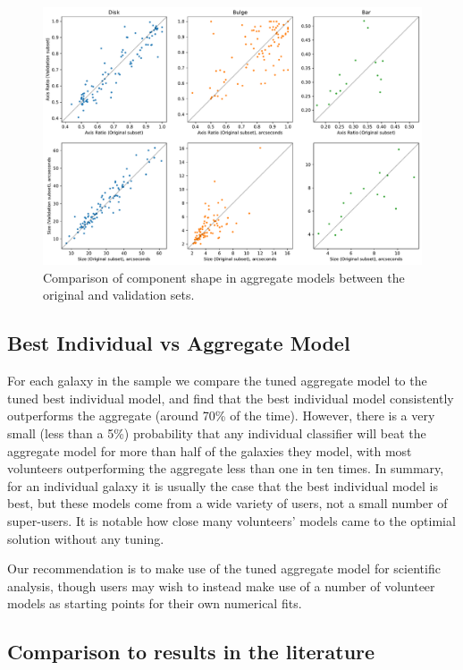 \documentclass[../main.tex]{subfiles}
\begin{document}
\begin{figure}
  \includegraphics[width=17.3cm]{images__results/component_sizing.pdf}
  \caption{Comparison of component shape in aggregate models between the original and validation sets.}
  \label{fig:aggregate_model_consistency}
\end{figure}

\subsection{Best Individual vs Aggregate Model}

For each galaxy in the sample we compare the tuned aggregate model to the tuned best individual model, and find that the best individual model consistently outperforms the aggregate (around 70\% of the time). However, there is a very small (less than a 5\%) probability that any individual classifier will beat the aggregate model for more than half of the galaxies they model, with most volunteers outperforming the aggregate less than one in ten times. In summary, for an individual galaxy it is usually the case that the best individual model is best, but these models come from a wide variety of users, not a small number of super-users. It is notable how close many volunteers' models came to the optimial solution without any tuning.

Our recommendation is to make use of the tuned aggregate model for scientific analysis, though users may wish to instead make use of a number of volunteer models as starting points for their own numerical fits.


\subsection{Comparison to results in the literature}
\end{document}
